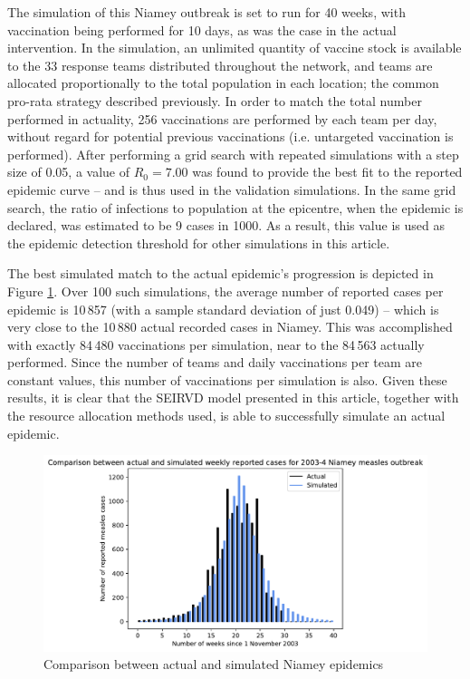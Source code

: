 \documentclass[10pt,letterpaper]{article}
\begin{document}
The simulation of this Niamey outbreak is set to run for 40 weeks, with vaccination being performed for 10 days, as was the case in the actual intervention. In the simulation, an unlimited quantity of vaccine stock is available to the 33 response teams distributed throughout the network, and teams are allocated proportionally to the total population in each location; the common pro-rata strategy described previously. In order to match the total number performed in actuality, 256 vaccinations are performed by each team per day, without regard for potential previous vaccinations (i.e. untargeted vaccination is performed). After performing a grid search with repeated simulations with a step size of 0.05, a value of $R_{0} = 7.00$ was found to provide the best fit to the reported epidemic curve -- and is thus used in the validation simulations. In the same grid search, the ratio of infections to population at the epicentre, when the epidemic is declared, was estimated to be 9 cases in 1000. As a result, this value is used as the epidemic detection threshold for other simulations in this article.

The best simulated match to the actual epidemic's progression is depicted in Figure \ref{fig:validation_histograms}. Over 100 such simulations, the average number of reported cases per epidemic is 10\,857 (with a sample standard deviation of just 0.049) -- which is very close to the 10\,880 actual recorded cases in Niamey. This was accomplished with exactly 84\,480 vaccinations per simulation, near to the 84\,563 actually performed. Since the number of teams and daily vaccinations per team are constant values, this number of vaccinations per simulation is also. 
Given these results, it is clear that the SEIRVD model presented in this article, together with the resource allocation methods used, is able to successfully simulate an actual epidemic.

\begin{figure}[ht!]{\textwidth}
    \includegraphics[width=\textwidth]{figures/validation/niamey_histograms.pdf}
    \caption{Comparison between actual and simulated Niamey epidemics}
    \label{fig:validation_histograms}
\end{figure}
\end{document}
